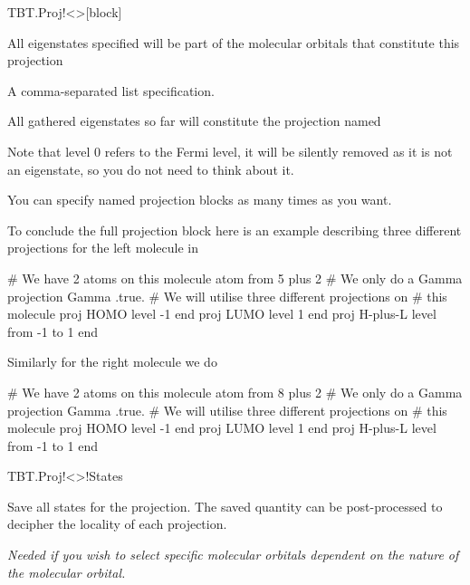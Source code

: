 \begin{fdfentry}{TBT.Proj!<>}[block]
\begin{fdfoptions}
\begin{fdfoptions}
      \option[level <E1> <E2> ... <En>] %
      All eigenstates specified will be part of the molecular orbitals
      that constitute this projection

      \option[level {[ <list> ]}] %
      A comma-separated list specification.

      \option[end] %
      All gathered eigenstates so far will constitute the projection
      named 
      
    \end{fdfoptions}

    Note that level $0$ refers to the Fermi level, it will be silently
    removed as it is not an eigenstate, so you do not need to think
    about it.

    You can specify named projection blocks as many times as you want.

    To conclude the full projection block here is an example
    describing three different projections for the left molecule in
    \begin{fdfexample}
   # We have 2 atoms on this molecule
   atom from 5 plus 2
   # We only do a Gamma projection
   Gamma .true.
   # We will utilise three different projections on 
   # this molecule
   proj HOMO
    level -1
   end 
   proj LUMO
    level 1
   end
   proj H-plus-L
    level from -1 to 1
   end
    \end{fdfexample}

    Similarly for the right molecule we do
    \begin{fdfexample}
   # We have 2 atoms on this molecule
   atom from 8 plus 2
   # We only do a Gamma projection
   Gamma .true.
   # We will utilise three different projections on 
   # this molecule
   proj HOMO
    level -1
   end 
   proj LUMO
    level 1
   end
   proj H-plus-L
    level from -1 to 1
   end
    \end{fdfexample}
   
  \end{fdfoptions}
 
\end{fdfentry}


\begin{fdflogicalF}{TBT.Proj!<>!States}%

  Save all states for the projection. The saved quantity can be
  post-processed to decipher the locality of each projection.
  
  \emph{Needed if you wish to select specific molecular orbitals
      dependent on the nature of the molecular orbital.}
  
\end{fdflogicalF}


